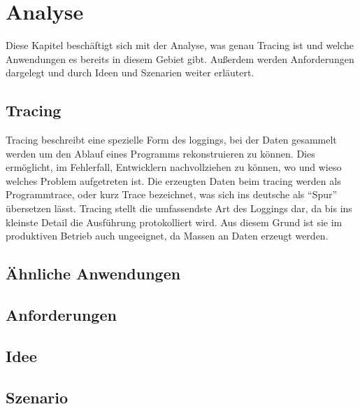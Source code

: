 
\chapter{Analyse}

Diese Kapitel beschäftigt sich mit der Analyse, was genau Tracing ist und welche Anwendungen es bereits in diesem Gebiet gibt. Außerdem werden Anforderungen dargelegt und durch Ideen und Szenarien weiter erläutert.

\section{Tracing} 

Tracing beschreibt eine spezielle Form des loggings, bei der Daten gesammelt werden um den Ablauf eines Programms rekonstruieren zu können. Dies ermöglicht, im Fehlerfall, Entwicklern nachvollziehen zu können, wo und wieso welches Problem aufgetreten ist. Die erzeugten Daten beim tracing werden als Programmtrace, oder kurz Trace bezeichnet, was sich ins deutsche als "`Spur"' übersetzen lässt. Tracing stellt die umfassendste Art des Loggings dar, da bis ins kleinste Detail die Ausführung protokolliert wird. Aus diesem Grund ist sie im produktiven Betrieb auch ungeeignet, da Massen an Daten erzeugt werden.

\section{Ähnliche Anwendungen} 



\section{Anforderungen} 
\label{sec:anforderungen}



\section{Idee} 



\section{Szenario} 

